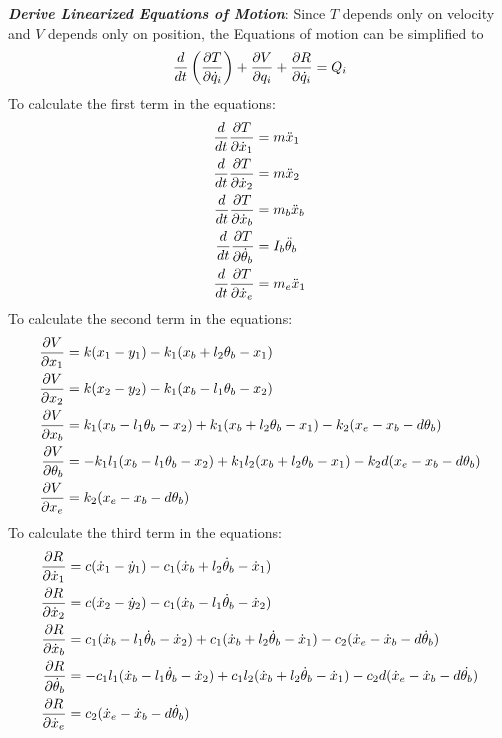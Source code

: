 \documentclass[11pt, oneside]{article}   	%
\begin{document}
\textbf{\textit{Derive Linearized Equations of Motion}}:
Since $T$ depends only on velocity and $V$ depends only on position, the Equations of motion can be simplified to
\begin{equation}
 \frac{d}{dt} \left( \pdv{T}{\dot{q}_i} \right) + \pdv{V}{q_i} + \pdv{R}{\dot{q}_i} = Q_i
\end{equation}
\noindent
To calculate the first term in the equations:
\begin{align}
\frac{d}{dt}\pdv{T}{\dot{x}_1} &= m \ddot{x}_1\\
\frac{d}{dt}\pdv{T}{\dot{x}_2} &= m \ddot{x}_2\\
\frac{d}{dt}\pdv{T}{\dot{x}_b} &= m_b \ddot{x}_b\\
\frac{d}{dt}\pdv{T}{\dot{\theta}_b} &= I_b \ddot{\theta}_b\\
\frac{d}{dt}\pdv{T}{\dot{x}_e} &= m_e \ddot{x}_1
\end{align}
\noindent To calculate the second term in the equations:
\begin{align}
\pdv{V}{x_1} &= k(x_1 - y_1) - k_1(x_b + l_2 \theta_b - x_1) \\
\pdv{V}{x_2} &= k(x_2 - y_2) - k_1(x_b - l_1 \theta_b - x_2) \\
\pdv{V}{x_b} &= k_1 (x_b - l_1 \theta_b - x_2) + k_1(x_b + l_2 \theta_b-x_1) - k_2(x_e - x_b - d \theta_b)\\
\pdv{V}{\theta_b} &= -k_1 l_1 (x_b - l_1 \theta_b - x_2) + k_1 l_2 (x_b + l_2 \theta_b - x_1) - k_2d(x_e-x_b-d \theta_b) \\
\pdv{V}{x_e} &= k_2 (x_e - x_b - d \theta_b)
\end{align}
\noindent To calculate the third term in the equations:
\begin{align}
\pdv{R}{\dot{x}_1} &= c(\dot{x}_1 - \dot{y}_1) - c_1(\dot{x}_b + l_2 \dot{\theta}_b - \dot{x}_1) \\
\pdv{R}{\dot{x}_2} &= c(\dot{x}_2 - \dot{y}_2) - c_1(\dot{x}_b - l_1 \dot{\theta}_b - \dot{x}_2) \\
\pdv{R}{\dot{x}_b} &= c_1 (\dot{x}_b - l_1 \dot{\theta}_b - \dot{x}_2) + c_1(\dot{x}_b + l_2 \dot{\theta}_b-\dot{x}_1) - c_2(\dot{x}_e - \dot{x}_b - d \dot{\theta}_b)\\
\pdv{R}{\dot{\theta}_b} &= -c_1 l_1 (\dot{x}_b - l_1 \dot{\theta}_b - \dot{x}_2) + c_1 l_2 (\dot{x}_b + l_2 \dot{\theta}_b - \dot{x}_1) - c_2d(\dot{x}_e-\dot{x}_b-d \dot{\theta_b}) \\
\pdv{R}{\dot{x}_e} &= c_2 (\dot{x}_e - \dot{x}_b - d \dot{\theta}_b)
\end{align}
\end{document}
